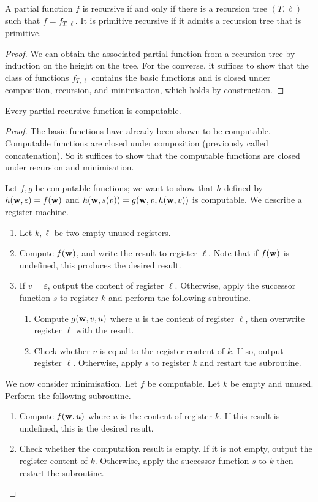 \begin{theorem}
	A partial function \( f \) is recursive if and only if there is a recursion tree \( (T, \ell) \) such that \( f = f_{T, \ell} \).
	It is primitive recursive if it admits a recursion tree that is primitive.
\end{theorem}
\begin{proof}
	We can obtain the associated partial function from a recursion tree by induction on the height on the tree.
	For the converse, it suffices to show that the class of functions \( f_{T,\ell} \) contains the basic functions and is closed under composition, recursion, and minimisation, which holds by construction.
\end{proof}
\begin{theorem}
	Every partial recursive function is computable.
\end{theorem}
\begin{proof}
	The basic functions have already been shown to be computable.
	Computable functions are closed under composition (previously called concatenation).
	So it suffices to show that the computable functions are closed under recursion and minimisation.

	Let \( f, g \) be computable functions; we want to show that \( h \) defined by \( h(\vb w, \varepsilon) = f(\vb w) \) and \( h(\vb w, s(v)) = g(\vb w, v, h(\vb w, v)) \) is computable.
	We describe a register machine.
	\begin{enumerate}
		\item Let \( k, \ell \) be two empty unused registers.
		\item Compute \( f(\vb w) \), and write the result to register \( \ell \).
			Note that if \( f(\vb w) \) is undefined, this produces the desired result.
		\item If \( v = \varepsilon \), output the content of register \( \ell \).
			Otherwise, apply the successor function \( s \) to register \( k \) and perform the following subroutine.
			\begin{enumerate}
				\item Compute \( g(\vb w, v, u) \) where \( u \) is the content of register \( \ell \), then overwrite register \( \ell \) with the result.
				\item Check whether \( v \) is equal to the register content of \( k \).
					If so, output register \( \ell \).
					Otherwise, apply \( s \) to register \( k \) and restart the subroutine.
			\end{enumerate}
	\end{enumerate}
	We now consider minimisation.
	Let \( f \) be computable.
	Let \( k \) be empty and unused.
	Perform the following subroutine.
	\begin{enumerate}
		\item Compute \( f(\vb w, u) \) where \( u \) is the content of register \( k \).
			If this result is undefined, this is the desired result.
		\item Check whether the computation result is empty.
			If it is not empty, output the register content of \( k \).
			Otherwise, apply the successor function \( s \) to \( k \) then restart the subroutine.
	\end{enumerate}
\end{proof}

